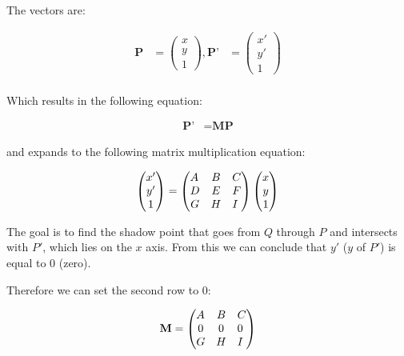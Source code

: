 \documentclass[12pt]{article}
\begin{document}
The vectors are:

\begin{align}
\textbf{P} &=
\begin{pmatrix}
x \\
y \\
1  
\end{pmatrix} \nonumber 
, 
\textbf{P'} &=
\begin{pmatrix}
x' \\
y' \\
1  
\end{pmatrix} \nonumber \\
\end{align}

Which results in the following equation:

\begin{align}
\textbf{P'} &= \textbf{M} \textbf{P}
\end{align}

and expands to the following matrix multiplication equation:

\begin{align}
\begin{pmatrix}
x' \\
y' \\
1  
\end{pmatrix} \nonumber
&=
\begin{pmatrix}
A \hfill & B & C \\
D & E & F \hfill \\
G & H & I \hfill 
\end{pmatrix} \nonumber
\begin{pmatrix}
x \\
y \\
1  
\end{pmatrix} \nonumber \\
\end{align}


The goal is to find the shadow point that goes from $Q$ through $P$ 
and intersects with $P'$, which lies on the $x$ axis. 
From this we can conclude that $y'$ ($y$ of $P'$) is equal to 0 (zero).

Therefore we can set the second row to $0$:

\begin{align}
\textbf{M} &=
\begin{pmatrix}
A \hfill & B & C \\
0 & 0 & 0 \hfill \\
G & H & I \hfill 
\end{pmatrix} \nonumber \\
\end{align}
\end{document}
